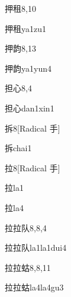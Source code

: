 \begin{entry}{押租}{8,10}
  \begin{phonetics}{押租}{ya1zu1}
  \end{phonetics}
\end{entry}

\begin{entry}{押韵}{8,13}
  \begin{phonetics}{押韵}{ya1yun4}
  \end{phonetics}
\end{entry}

\begin{entry}{担心}{8,4}
  \begin{phonetics}{担心}{dan1xin1}
  \end{phonetics}
\end{entry}

\begin{entry}{拆}{8}[Radical 手]
  \begin{phonetics}{拆}{chai1}
  \end{phonetics}
\end{entry}

\begin{entry}{拉}{8}[Radical 手]
  \begin{phonetics}{拉}{la1}
  \end{phonetics}
  \begin{phonetics}{拉}{la4}
  \end{phonetics}
\end{entry}

\begin{entry}{拉拉队}{8,8,4}
  \begin{phonetics}{拉拉队}{la1la1dui4}
  \end{phonetics}
\end{entry}

\begin{entry}{拉拉蛄}{8,8,11}
  \begin{phonetics}{拉拉蛄}{la4la4gu3}
  \end{phonetics}
\end{entry}

